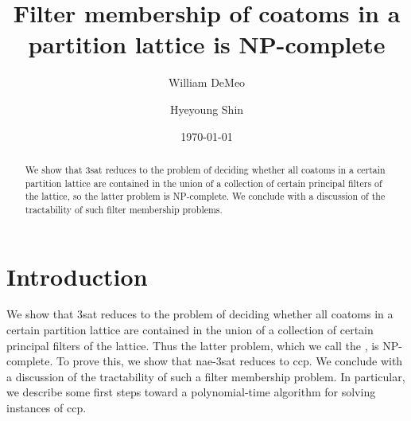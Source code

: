 \documentclass[12pt]{amsart}
\numberwithin{equation}{section}
\theoremstyle{plain}
\theoremstyle{definition}
\newcommand{\ccp}{\acs{ccp}\xspace}
\newcommand{\sat}{\acs{sat}\xspace}
\newcommand{\nae}{\acs{nae}\xspace}
\newcommand{\NP}{\acs{NP}\xspace}
\begin{document}
\title[NP-completeness of coatom counting]{Filter membership of coatoms
  in a\\ partition lattice is NP-complete}
\date{\today}
\author[W.~DeMeo]{William DeMeo}
\address{University of Hawaii}

\author[H.~Shin]{Hyeyoung Shin}
\address{University of Hawaii}


\maketitle

\begin{abstract}
We show that 3\sat %
reduces to the problem of deciding whether all coatoms in a certain partition
lattice are contained in the union of a collection of certain principal filters
of the lattice, so the latter problem is \NP-complete.
We conclude with a discussion of the tractability of
such filter membership problems.
\end{abstract}

\section{Introduction}
\label{sec:introduction}
We show that 3\sat %
reduces to the problem of deciding whether all coatoms in a certain partition
lattice are contained in the union of a collection of certain principal filters
of the lattice. Thus the latter problem, which we call the
, is \NP-complete.
To prove this, we show that \nae-3\sat reduces to \ccp.
We conclude with a discussion of the tractability of
such a filter membership problem. In particular, we describe some first steps
toward a polynomial-time algorithm for solving instances of \ccp.

\end{document}
